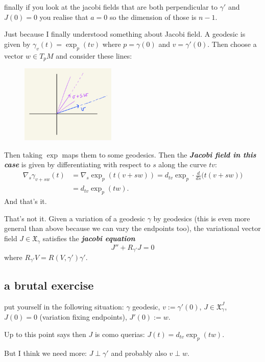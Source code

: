 finally if you look at the jacobi fields that are both perpendicular to \(\gamma'\) and \(J(0)=0\) you realise that \(a=0\) so the dimension of those is \(n-1\).

Just because I finally understood something about Jacobi field. A geodesic is given by \(\gamma_v(t)=\operatorname{exp}_p(tv)\) where \(p=\gamma(0)\) and \(v=\gamma'(0)\). Then choose a vector \(w \in T_pM\) and consider these lines:
\begin{figure}[H]
	\centering
	\includegraphics[width=0.4\textwidth]{fig2}
\end{figure}
Then taking \(\operatorname{exp}\) maps them to some geodesics. Then the \textit{\textbf{Jacobi field in this case}} is given by differentiating with respect to \(s\) along the curve \(tv\):
\begin{align*}\nabla_s \gamma_{v+sw}(t)&=\nabla_s \operatorname{exp}_p(t(v+sw))=d_{tv}\operatorname{exp}_p\cdot \frac{d}{ds}\Big(t(v+sw)\Big)\\&=d_{tv}\operatorname{exp}_p(tw).\end{align*}
And that's it.

That's not it. Given a variation of a geodesic \(\gamma\) by geodesics (this is even more general than above because we can vary the endpoints too), the variational vector field \(J \in \mathfrak{X}_\gamma\) satisfies the \textit{\textbf{jacobi equation}} 
\[J''+R_{\gamma'}J=0\]
where \(R_{\gamma'}V=R(V,\gamma')\gamma'\).

\subsection{a brutal exercise}

put yourself in the following situation: \(\gamma\) geodesic, \(v:=\gamma'(0)\), \(J \in \mathfrak{X}^J_\gamma\), \(J(0)=0\) (variation fixing endpoints), \(J'(0):=w\).

Up to this point \cite{au} says then \(J\) is como querias: \(J(t)=d_{tv}\operatorname{exp}_p(tw)\).

But I think we need more: \(J \perp \gamma'\) and probably also \(v \perp w\).

